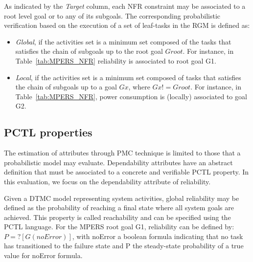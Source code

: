 
As indicated by the \textit{Target} column, each NFR constraint may be associated to a root level goal or to any of its subgoals. The corresponding probabilistic verification based on the execution of a set of leaf-tasks in the RGM is defined as:

\begin{itemize}

\item \textit{Global}, if the activities set is a minimum set composed of the tasks that satisfies the chain of subgoals up to the root goal $Groot$. For instance, in Table~\ref{tab:MPERS_NFR} reliability is associated to root goal G1.
\medskip

\item \textit{Local}, if the activities set is a minimum set composed of tasks that satisfies the chain of subgoals up to a goal $Gx$, where $Gx != Groot$. For instance, in Table~\ref{tab:MPERS_NFR}, power consumption is (locally) associated to goal G2.
\medskip

\end{itemize}


\subsection{PCTL properties}

The estimation of attributes through PMC technique is limited to those that a probabilistic model may evaluate. Dependability attributes have an abstract definition that must be associated to a concrete and verifiable PCTL property. In this evaluation, we focus on the dependability attribute of reliability. 

Given a DTMC model representing system activities, global reliability may be defined as the probability of reaching a final state where all system goals are achieved. This property is called reachability and can be specified using the PCTL language. For the MPERS root goal G1, reliability can be defined by: $ P=? [ G (noError) ] $, with noError a boolean formula indicating that no task has transitioned to the failure state and P the steady-state probability of a true value for noError formula.


%
%
%



